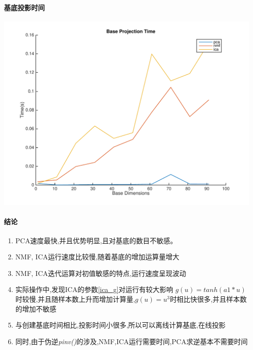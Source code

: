 \paragraph{基底投影时间}
\begin{center}
\begin{minipage}[t]{\linewidth}
\center
{
\includegraphics[width=\textwidth]{Img/pni_baseproj} 
\label{fig:ica_base}
}
\end{minipage}
\medskip
\end{center}

\paragraph{结论}
\begin{enumerate}
	\item PCA速度最快,并且优势明显,且对基底的数目不敏感。
	\item NMF, ICA运行速度比较慢,随着基底的增加运算量增大
	\item NMF, ICA迭代运算对初值敏感的特点,运行速度呈现波动
	\item 实际操作中,发现ICA的参数\ref{ica_g}对运行有较大影响
		$g(u)=tanh(a1*u)$时较慢,并且随样本数上升而增加计算量,$g(u) = u^3$时相比快很多,并且样本数的增加不敏感
	\item 与创建基底时间相比,投影时间小很多,所以可以离线计算基底,在线投影
	\item 同时,由于伪逆\textit{pinv()}的涉及,NMF,ICA运行需要时间,PCA求逆基本不需要时间
\end{enumerate}



